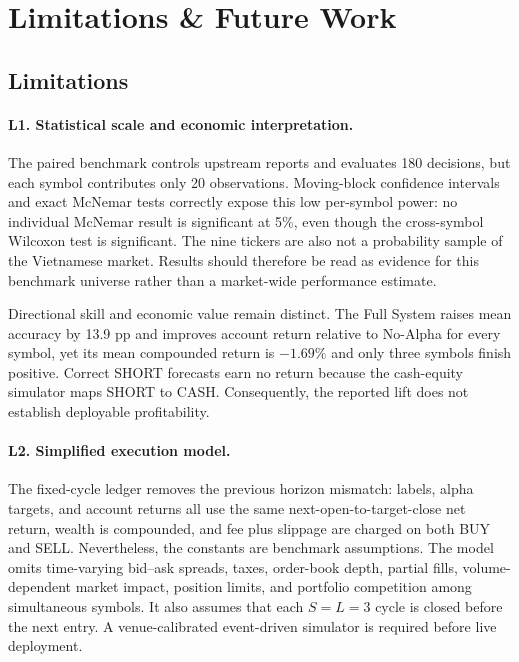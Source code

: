 \section{Limitations \& Future Work}
\label{sec:limitations_futurework}

\subsection{Limitations}

\paragraph{L1. Statistical scale and economic interpretation.}
The paired benchmark controls upstream reports and evaluates 180 decisions, but each symbol contributes only 20 observations. Moving-block confidence intervals and exact McNemar tests correctly expose this low per-symbol power: no individual McNemar result is significant at 5\%, even though the cross-symbol Wilcoxon test is significant. The nine tickers are also not a probability sample of the Vietnamese market. Results should therefore be read as evidence for this benchmark universe rather than a market-wide performance estimate.

Directional skill and economic value remain distinct. The Full System raises mean accuracy by 13.9 pp and improves account return relative to No-Alpha for every symbol, yet its mean compounded return is $-1.69\%$ and only three symbols finish positive. Correct SHORT forecasts earn no return because the cash-equity simulator maps SHORT to CASH. Consequently, the reported lift does not establish deployable profitability.

\paragraph{L2. Simplified execution model.}
The fixed-cycle ledger removes the previous horizon mismatch: labels, alpha targets, and account returns all use the same next-open-to-target-close net return, wealth is compounded, and fee plus slippage are charged on both BUY and SELL. Nevertheless, the constants are benchmark assumptions. The model omits time-varying bid--ask spreads, taxes, order-book depth, partial fills, volume-dependent market impact, position limits, and portfolio competition among simultaneous symbols. It also assumes that each $S=L=3$ cycle is closed before the next entry. A venue-calibrated event-driven simulator is required before live deployment.

